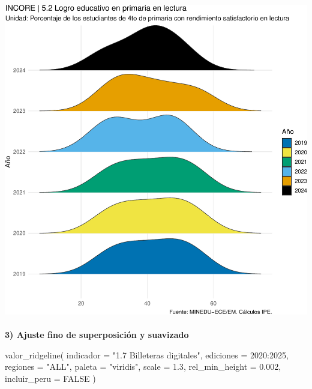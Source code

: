 \documentclass[
  11pt,
  letterpaper,
  DIV=11,
  numbers=noendperiod]{scrartcl}
\makeatletter
\let\oldparagraph\paragraph
\renewcommand{\paragraph}{
    \@ifstar
      \xxxParagraphStar
      \xxxParagraphNoStar
  }
\newcommand{\xxxParagraphStar}[1]{\oldparagraph*{#1}\mbox{}}
\newcommand{\xxxParagraphNoStar}[1]{\oldparagraph{#1}\mbox{}}
\newenvironment{Shaded}{\begin{snugshade}}{\end{snugshade}}
\newcommand{\AttributeTok}[1]{\textcolor[rgb]{0.40,0.45,0.13}{#1}}
\newcommand{\ConstantTok}[1]{\textcolor[rgb]{0.56,0.35,0.01}{#1}}
\newcommand{\DecValTok}[1]{\textcolor[rgb]{0.68,0.00,0.00}{#1}}
\newcommand{\FloatTok}[1]{\textcolor[rgb]{0.68,0.00,0.00}{#1}}
\newcommand{\FunctionTok}[1]{\textcolor[rgb]{0.28,0.35,0.67}{#1}}
\newcommand{\NormalTok}[1]{\textcolor[rgb]{0.00,0.23,0.31}{#1}}
\newcommand{\SpecialCharTok}[1]{\textcolor[rgb]{0.37,0.37,0.37}{#1}}
\newcommand{\StringTok}[1]{\textcolor[rgb]{0.13,0.47,0.30}{#1}}
\makeatother
\begin{document}
\includegraphics{Manual_files/figure-pdf/unnamed-chunk-104-1.pdf}

\paragraph{\texorpdfstring{\textbf{3) Ajuste fino de superposición y
suavizado}}{3) Ajuste fino de superposición y suavizado}}\label{ajuste-fino-de-superposiciuxf3n-y-suavizado}

\begin{Shaded}
\begin{Highlighting}[]
\FunctionTok{valor\_ridgeline}\NormalTok{(}
  \AttributeTok{indicador       =} \StringTok{"1.7 Billeteras digitales"}\NormalTok{,}
  \AttributeTok{ediciones       =} \DecValTok{2020}\SpecialCharTok{:}\DecValTok{2025}\NormalTok{,}
  \AttributeTok{regiones        =} \StringTok{"ALL"}\NormalTok{,}
  \AttributeTok{paleta          =} \StringTok{"viridis"}\NormalTok{,}
  \AttributeTok{scale           =} \FloatTok{1.3}\NormalTok{,}
  \AttributeTok{rel\_min\_height  =} \FloatTok{0.002}\NormalTok{,}
  \AttributeTok{incluir\_peru    =} \ConstantTok{FALSE}
\NormalTok{)}
\end{Highlighting}
\end{Shaded}
\end{document}
